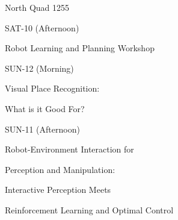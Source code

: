 \documentclass{article}
\begin{document}
\rssheader[1in]

\fontsize{32pt}{36pt}
\selectfont
\begin{center}
North Quad 1255
\end{center}

\vfill

\fontsize{48pt}{56pt}
\selectfont
\begin{center}
SAT-10 (Afternoon)
\end{center}

\fontsize{24pt}{28pt}
\selectfont
\begin{center}
Robot Learning and Planning Workshop
\end{center}

\vfill

\fontsize{48pt}{56pt}
\selectfont
\begin{center}
SUN-12 (Morning)
\end{center}

\fontsize{24pt}{24pt}
\selectfont
\begin{center}
Visual Place Recognition: \par \noindent What is it Good For?
\end{center}

\vfill

\fontsize{48pt}{56pt}
\selectfont
\begin{center}
SUN-11 (Afternoon)
\end{center}

\fontsize{24pt}{24pt}
\selectfont
\begin{center}
Robot-Environment Interaction for \par \noindent
Perception and Manipulation: \par \noindent
Interactive Perception Meets \par \noindent
Reinforcement Learning and Optimal Control
\end{center}


\vfill
\end{document}
